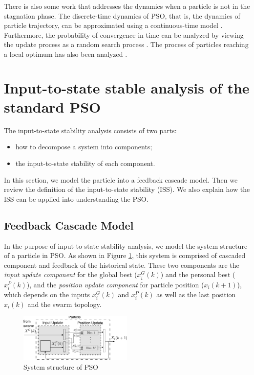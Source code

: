 \documentclass{sig-alternate}
\begin{document}
There is also some work that addresses the dynamics when a particle is not in the stagnation phase.
The discrete-time dynamics of PSO, that is, the dynamics of particle trajectory, can be approximated
using a continuous-time model
\cite{5675669}.
Furthermore, the probability of convergence in time can be analyzed
by viewing the update process as a random search process
\cite{vandenBergh:2010:CPP:2010420.2010421}.
The process of particles reaching a local optimum
has also been analyzed
\cite{Schmitt:2013:PSO:2463372.2463563}.

\section{Input-to-state stable analysis of the standard PSO}
\label{sec:sys_model}

The input-to-state stability analysis consists of two parts:
\begin{itemize}
\item how to decompose a system into components;
\item the input-to-state stability of each component.
\end{itemize}
In this section, we model the particle into a feedback cascade model.
Then we review the definition of the input-to-state stability (ISS).
We also explain how the ISS can be applied into understanding the PSO.

\subsection{Feedback Cascade Model}

In the purpose of input-to-state stability analysis, we model the system structure of a particle in PSO.
As shown in Figure \ref{fig:sys_flow}, this system is comprised of cascaded component and feedback of the historical state.
These two components are the 
\emph{input update component} for the global best ($ x^{G}_{i}(k) $) and the personal best ($ x^{P}_{i}(k) $), and the 
\emph{position update component} for particle position ($ x_{i}(k+1) $), which depends on the inputs $ x^{G}_{i}(k) $ and $ x^{P}_{i}(k) $ as well as the last position $ x_{i}(k) $ and the swarm topology.

\begin{figure}
	\centering
	\includegraphics[width=0.5\textwidth]{particle_sys_flow.pdf}
	\caption{System structure of PSO}
	\label{fig:sys_flow}
\end{figure}
\end{document}
